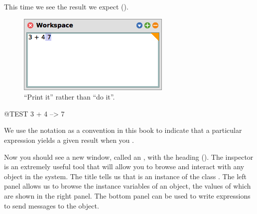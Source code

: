 \documentclass[a4paper,10pt,twoside]{book}
\begin{document}
This time we see the result we expect ().

\begin{figure}[htb]
\centerline {\includegraphics[scale=0.7]{PrintIt}}
\caption{``Print it'' rather than ``do it''. \label{fig:printit}}
\end{figure}

\begin{code}{@TEST}
3 + 4 --> 7
\end{code}
\noindent
We use the notation \ct{-->} as a convention in this book to indicate that a particular \sq expression yields a given result when you .

\noindent
Now you should see a new window, called an , with the heading  ().
The inspector is an extremely useful tool that will allow you to browse and interact with any object in the system.
The title tells us that  is an instance of the class .
The left panel allows us to browse the instance variables of an object, the values of which are shown in the right panel.
The bottom panel can be used to write expressions to send messages to the object.
\end{document}
